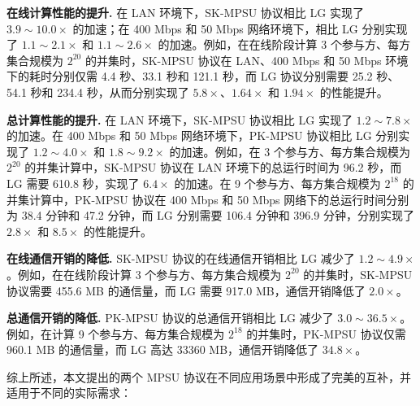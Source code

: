 \begin{trivlist}
\item \textbf{在线计算性能的提升.}
在 LAN 环境下，SK-MPSU 协议相比 LG 实现了 $3.9 \sim 10.0 \times$ 的加速；在 400 Mbps 和 50 Mbps 网络环境下，相比 LG 分别实现了 $1.1 \sim 2.1 \times$ 和 $1.1 \sim 2.6 \times$ 的加速。例如，在在线阶段计算 3 个参与方、每方集合规模为 $2^{20}$ 的并集时，SK-MPSU 协议在 LAN、400 Mbps 和 50 Mbps 环境下的耗时分别仅需 4.4 秒、33.1 秒和 121.1 秒，而 LG 协议分别需要 25.2 秒、54.1 秒和 234.4 秒，从而分别实现了 $5.8 \times$、$1.64 \times$ 和 $1.94 \times$ 的性能提升。

\item \textbf{总计算性能的提升.}
在 LAN 环境下，SK-MPSU 协议相比 LG 实现了 $1.2 \sim 7.8 \times$ 的加速。在 400 Mbps 和 50 Mbps 网络环境下，PK-MPSU 协议相比 LG 分别实现了 $1.2 \sim 4.0 \times$ 和 $1.8 \sim 9.2 \times$ 的加速。例如，在 3 个参与方、每方集合规模为 $2^{20}$ 的并集计算中，SK-MPSU 协议在 LAN 环境下的总运行时间为 96.2 秒，而 LG 需要 610.8 秒，实现了 $6.4 \times$ 的加速。在 9 个参与方、每方集合规模为 $2^{18}$ 的并集计算中，PK-MPSU 协议在 400 Mbps 和 50 Mbps 网络下的总运行时间分别为 38.4 分钟和 47.2 分钟，而 LG 分别需要 106.4 分钟和 396.9 分钟，分别实现了 $2.8 \times$ 和 $8.5 \times$ 的性能提升。

\item \textbf{在线通信开销的降低.}
SK-MPSU 协议的在线通信开销相比 LG 减少了 $1.2 \sim 4.9 \times$。例如，在在线阶段计算 3 个参与方、每方集合规模为 $2^{20}$ 的并集时，SK-MPSU 协议需要 455.6 MB 的通信量，而 LG 需要 917.0 MB，通信开销降低了 $2.0 \times$。

\item \textbf{总通信开销的降低.}
PK-MPSU 协议的总通信开销相比 LG 减少了 $3.0 \sim 36.5 \times$。例如，在计算 9 个参与方、每方集合规模为 $2^{18}$ 的并集时，PK-MPSU 协议仅需 960.1 MB 的通信量，而 LG 高达 33360 MB，通信开销降低了 $34.8 \times$。
\end{trivlist}

综上所述，本文提出的两个 MPSU 协议在不同应用场景中形成了完美的互补，并适用于不同的实际需求：

